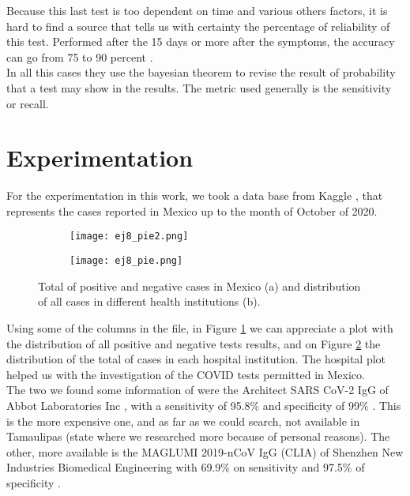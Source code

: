 \documentclass{article}
\begin{document}
Because this last test is too dependent on time and various others factors, it is hard to find a source that tells us with certainty the percentage of reliability of this test. Performed after the 15 days or more after the symptoms, the accuracy can go from 75 to 90 percent \cite{cont}.\\

In all this cases they use the bayesian theorem to revise the result of probability that a test may show in the results. The metric used generally is the sensitivity or recall. \\

\section{Experimentation}

For the experimentation in this work, we took a data base from Kaggle \cite{kaggle}, that represents the cases reported in Mexico up to the month of October of 2020. \\

\begin{figure}[]
\begin{subfigure}{.5\textwidth}
  \centering
  \texttt{[image: ej8\_pie2.png]}  
  \caption{  }
  \label{sb2-1}
\end{subfigure}
\begin{subfigure}{.5\textwidth}
  \centering
  \texttt{[image: ej8\_pie.png]}  
  \caption{ }
  \label{sb2-2}
\end{subfigure}
	\caption{Total of positive and negative cases in Mexico (a) and distribution of all cases in different health institutions (b).}
\label{fig2}
\end{figure}

Using some of the columns in the file, in Figure \ref{sb2-1} we can appreciate a plot with the distribution of all positive and negative tests results, and on Figure \ref{sb2-2} the distribution of the total of cases in each hospital institution. The hospital plot helped us with the investigation of the COVID tests permitted in Mexico. \\

The two we found some information of were the Architect SARS CoV-2 IgG of Abbot Laboratories Inc \cite{xalaka}, with a sensitivity of 95.8\% and specificity of 99\% \cite{fda2}. This is the more expensive one, and as far as we could search, not available in Tamaulipas (state where we researched more because of personal reasons). The other, more available is the MAGLUMI 2019-nCoV IgG (CLIA) of Shenzhen New Industries Biomedical Engineering \cite{xalaka} with 69.9\% on sensitivity and 97.5\% of specificity \cite{fda2}. \\ 
 
\end{document}
